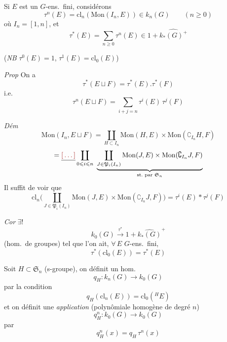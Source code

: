 \documentclass[11pt,a4paper]{article}
\begin{document}
Si $E$ est un $G$-ens.\ fini, considérons
\[
  \tau^{n}(E) = \mathrm{cl}_n(\mathrm{Mon}(I_n, E)) \in k_n(G) \qquad (n \geqslant 0)
\]
où $I_n = [1, n]$, et
\[
  \tau^{*}(E) = \sum_{n \geqslant 0} \tau^{n}(E) \in 1 + \widehat{k_*(G)^{+}}
\]

(\emph{NB} $\tau^{0}(E) = 1$, $\tau^{1}(E) = \mathrm{cl}_0(E)$)

\emph{Prop} On a
\[
  \tau^{*}(E \sqcup F) = \tau^{*}(E) . \tau^{*}(F)
\]
i.e.
\[
  \tau^{n}(E \sqcup F) = \sum_{i+j=n} \tau^{i}(E)\, \tau^{j}(F)
\]

\emph{Dém} \struck{\ill{}}
\[
  \mathrm{Mon}(I_n, E \sqcup F) = \coprod_{H \subset I_n} \mathrm{Mon}(H, E) \times \mathrm{Mon}(\complement_{I_n} H, F)
\]
\[
  = \struck{\ill{}} \coprod_{0 \leqslant i \leqslant n} \ \underbrace{\coprod_{J \in \mathfrak{P}_i(I_n)} \mathrm{Mon}(J, E) \times \mathrm{Mon}(\complement_{I_n} J, F)}_{\text{st.\ par } \mathfrak{S}_n}
\]
Il suffit de voir que
\[
  \mathrm{cl}_n\Big(\coprod_{J \in \mathfrak{P}_i(I_n)} \mathrm{Mon}(J, E) \times \mathrm{Mon}(\complement_{I_n} J, F)\Big) = \tau^{i}(E) * \tau^{j}(F)
\]

\emph{Cor} $\exists !$
\[
  k_0(G) \xrightarrow{\ \tau^{*}\ } 1 + \widehat{k_*(G)}^{+}
\]
(hom.\ de groupes) tel que l'on ait, $\forall\, E$ $G$-ens.\ fini,
\[
  \tau^{*}(\mathrm{cl}_0(E)) = \tau^{*}(E)
\]

Soit $H \subset \mathfrak{S}_n$ (s-groupe), on définit un hom.
\[
  q_H : k_n(G) \longrightarrow k_0(G)
\]
par la condition
\[
  q_H(\mathrm{cl}_n(E)) = \mathrm{cl}_0({}^{H}\!E)
\]
et on définit une  \emph{application} (polynômiale homogène de
degré $n$)
\[
  q^{n}_H : k_0(G) \longrightarrow k_0(G)
\]
par
\[
  q^{n}_H(x) = q_H\, \tau^{n}(x)
\]
\end{document}
